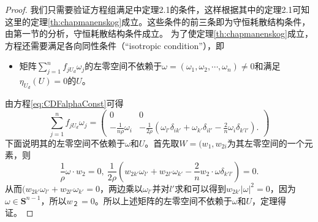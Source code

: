 	\begin{proof}
		我们只需要验证方程组满足\cite{yang2015validity}中定理2.1的条件，这样根据其中的定理2.1可知这里的定理\ref{th:chapmanenskog}成立。这些条件的前三条即为守恒耗散结构条件，由第一节的分析，守恒耗散结构条件成立。%
		为了使定理\ref{th:chapmanenskog}成立，方程还需要满足各向同性条件（“isotropic condition”），即
		\begin{itemize}
			\item 矩阵$\sum_{j=1}^n f_{jU_d} \omega_j$的左零空间不依赖于$\omega = (\omega_1,\omega_2,\cdots,\omega_n) \neq 0$和满足$\eta_{U_d}(U)=0$的$U$。
		\end{itemize}
		由方程\eqref{eq:CDFalphaConst}可得
		\begin{equation*}
			\sum_{j=1}^n f_{jU_d} \omega_j = \left( \begin{matrix}
				0 & 0 \\
				-\frac{1}{n \rho} \omega_i & -\frac{1}{2 \rho} (\omega_{l'} \delta_{ik'} + \omega_{k'} \delta_{il'} - \frac{2}{n} \omega_i \delta_{k'l'}).
			\end{matrix}
			\right)
		\end{equation*}
		下面说明其的左零空间不依赖于$\omega$和$U$。首先取$W=(w_1,w_{2i}$为其左零空间的一个元素，则
$$\frac{1}{\rho} \omega \cdot w_2=0, \ \frac{1}{2\rho} (w_{2k'}\omega_{l'} + w_{2l'}\omega_{k'} - \frac{2}{n} w_2 \cdot \omega \delta_{k'l'})=0.$$
从而$(w_{2k'}\omega_{l'} + w_{2l'}\omega_{k'}=0$，两边乘以$\omega_{l'}$并对$l'$求和可以得到$w_{2k'} |\omega|^2=0$，因为$\omega \in \mathbf{S}^{n-1}$，所以$w_２=0$。所以上述矩阵的左零空间不依赖于$\omega$和$U$，定理得证。
	\end{proof}
